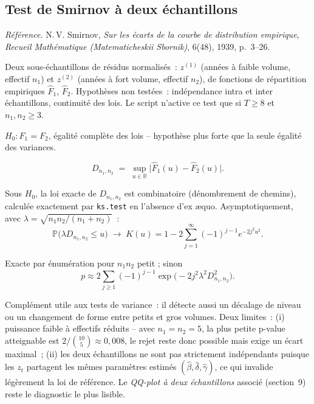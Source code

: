 \documentclass[a4paper,11pt]{article}
\newcommand{\code}[1]{\texttt{\small #1}}
\newcommand{\refl}[1]{{\small\textcolor{maincolor!70!black}{\textit{Référence.} #1}}\par\smallskip}
\newcounter{ficheid}
\newenvironment{fiche}[1]{%
  \stepcounter{ficheid}%
  \phantomsection
  \subsection{#1}%
  \label{fiche:\theficheid}%
}{%
  \end{description}\vspace{0.5em}%
}
\newcommand{\Cadre}{%
  \begin{description}[leftmargin=0pt, style=unboxed, itemsep=3pt, topsep=3pt, parsep=2pt]%
  \item[\textcolor{financeblue}{\textbf{1. Cadre, notations et hypothèses de validité (non testées).}}]}
\newcommand{\Hzero}{\item[\textcolor{financeblue}{\textbf{2. Hypothèse nulle.}}]}
\newcommand{\Stat}{\item[\textcolor{financeblue}{\textbf{3. Statistique de test.}}]}
\newcommand{\Loi}{\item[\textcolor{financeblue}{\textbf{4. Loi sous $H_0$.}}]}
\newcommand{\Pval}{\item[\textcolor{financeblue}{\textbf{5. p-value.}}]}
\newcommand{\Usage}{\item[\textcolor{financeblue}{\textbf{6. Usage et limites.}}]}
\begin{document}
\begin{fiche}{Test de Smirnov à deux échantillons}
\refl{N.\,V. Smirnov, \emph{Sur les écarts de la courbe de distribution empirique},
\emph{Recueil Mathématique (Matematicheskii Sbornik)}, 6(48), 1939, p.~3--26.}
\Cadre
Deux sous-échantillons de résidus normalisés~: $z^{(1)}$ (années à faible volume, effectif $n_1$)
et $z^{(2)}$ (années à fort volume, effectif $n_2$), de fonctions de répartition empiriques
$\hat F_1$, $\hat F_2$. Hypothèses non testées~: indépendance intra et inter échantillons,
continuité des lois. Le script n'active ce test que si $T \ge 8$ et $n_1, n_2 \ge 3$.
\Hzero
$H_0 : F_1 = F_2$, égalité complète des lois -- hypothèse plus forte que la seule égalité des
variances.
\Stat
\[
  D_{n_1,n_2} \;=\; \sup_{u \in \mathbb{R}} \big| \hat F_1(u) - \hat F_2(u) \big| .
\]
\Loi
Sous $H_0$, la loi exacte de $D_{n_1,n_2}$ est combinatoire (dénombrement de chemins), calculée
exactement par \code{ks.test} en l'absence d'ex \ae quo. Asymptotiquement, avec
$\lambda = \sqrt{n_1 n_2/(n_1+n_2)}$~:
\[
  \mathbb{P}\big(\lambda D_{n_1,n_2} \le u\big) \;\longrightarrow\;
  K(u) = 1 - 2\sum_{j=1}^{\infty} (-1)^{j-1} e^{-2 j^2 u^2}.
\]
\Pval
Exacte par énumération pour $n_1 n_2$ petit ; sinon
\[
  p \approx 2\sum_{j\ge1} (-1)^{j-1}\exp\!\big(-2 j^2 \lambda^2 D_{n_1,n_2}^2\big).
\]
\Usage
Complément utile aux tests de variance~: il détecte aussi un décalage de niveau ou un changement
de forme entre petits et gros volumes. Deux limites~: (i) puissance faible à effectifs réduits --
avec $n_1 = n_2 = 5$, la plus petite p-value atteignable est $2/\binom{10}{5} \approx 0{,}008$,
le rejet reste donc possible mais exige un écart maximal~; (ii) les deux échantillons ne sont pas
strictement indépendants puisque les $z_t$ partagent les mêmes paramètres estimés
$(\hat\beta, \hat\delta, \hat\gamma)$, ce qui invalide légèrement la loi de référence. Le
\emph{QQ-plot à deux échantillons} associé (section~9) reste le diagnostic le plus lisible.
\end{fiche}
\end{document}
